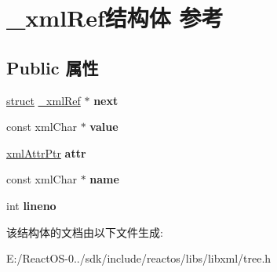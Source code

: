\hypertarget{struct__xml_ref}{}\section{\+\_\+xml\+Ref结构体 参考}
\label{struct__xml_ref}
\subsection*{Public 属性}
\begin{DoxyCompactItemize}
\item 
\mbox{\label{struct__xml_ref_a11ced87eb876462aefdaad07b6216e32}} 
\hyperlink{interfacestruct}{struct} \hyperlink{struct__xml_ref}{\+\_\+xml\+Ref} $\ast$ {\bfseries next}
\item 
\mbox{\label{struct__xml_ref_ac28785f779ebfd41e264c9e9e91e6660}} 
const xml\+Char $\ast$ {\bfseries value}
\item 
\mbox{\label{struct__xml_ref_a3ff97e4e127f1749ab2e59fdec0f8a8e}} 
\hyperlink{struct__xml_attr}{xml\+Attr\+Ptr} {\bfseries attr}
\item 
\mbox{\label{struct__xml_ref_a54973d491748936cc306713782f4f467}} 
const xml\+Char $\ast$ {\bfseries name}
\item 
\mbox{\label{struct__xml_ref_aa9d570e7f96cc7647c9b7fe96fc10eca}} 
int {\bfseries lineno}
\end{DoxyCompactItemize}


该结构体的文档由以下文件生成\+:\begin{DoxyCompactItemize}
\item 
E\+:/\+React\+O\+S-\/0../sdk/include/reactos/libs/libxml/tree.\+h\end{DoxyCompactItemize}
